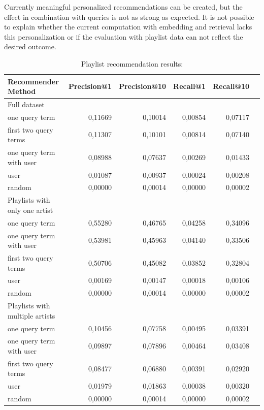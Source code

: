 \documentclass[sigconf]{acmart}
\begin{document}
Currently meaningful personalized recommendations can be created, but the effect in combination with queries is not as strong as expected. It is not possible to explain whether the current computation with embedding and retrieval lacks this personalization or if the evaluation with playlist data can not reflect the desired outcome.

\begin{table}
	\caption{Playlist recommendation results:}
	\label{table:playlist_rec_results}
	\begin{tabular}{lrrrrr}
		\midrule 
		\textbf{Recommender Method}& \textbf{Precision@1} & \textbf{Precision@10} & \textbf{Recall@1} & \textbf{Recall@10} \\ 
		
		\midrule 
		Full dataset \\
		\cmidrule{1-1}
		one query term  & 0,11669 & 0,10014 & 0,00854 & 0,07117 \\
		first two query terms & 0,11307 & 0,10101 & 0,00814 & 0,07140 \\
		one query term with user & 0,08988 & 0,07637 & 0,00269 & 0,01433  \\
		user & 0,01087 & 0,00937 & 0,00024 & 0,00208 \\
		random & 0,00000 & 0,00014 & 0,00000 & 0,00002 \\
		
		\midrule 
		Playlists with only one artist \\
		\cmidrule{1-1}
		one query term  & 0,55280 & 0,46765 & 0,04258 &	0,34096 \\
		one query term with user& 0,53981 & 0,45963 & 0,04140 & 0,33506 \\
		first two query terms & 0,50706 & 0,45082 & 0,03852 & 0,32804 \\
		user & 0,00169 & 0,00147 & 0,00018 & 0,00106 \\
		random & 0,00000 & 0,00014 & 0,00000 & 0,00002 \\ %
		
		\midrule 
		Playlists with multiple artists \\
		\cmidrule{1-1}
		one query term  & 0,10456 & 0,07758 & 0,00495 & 0,03391 \\
		one query term with user& 0,09897 & 0,07896 & 0,00464 & 0,03408 \\
		first two query terms & 0,08477 & 0,06880 & 0,00391 & 0,02920 \\
		user & 0,01979 &	0,01863 & 0,00038 & 0,00320 \\
		random & 0,00000 & 0,00014 & 0,00000 & 0,00002 \\ %
		
		\bottomrule
	\end{tabular}
\end{table}
\end{document}
